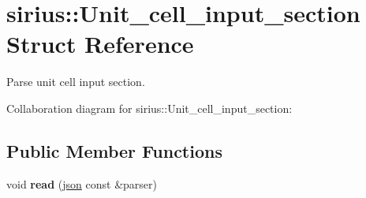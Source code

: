 \hypertarget{structsirius_1_1_unit__cell__input__section}{}\section{sirius\+:\+:Unit\+\_\+cell\+\_\+input\+\_\+section Struct Reference}
\label{structsirius_1_1_unit__cell__input__section}


Parse unit cell input section.  




Collaboration diagram for sirius\+:\+:Unit\+\_\+cell\+\_\+input\+\_\+section\+:
\subsection*{Public Member Functions}
\begin{DoxyCompactItemize}
\item 
\hypertarget{structsirius_1_1_unit__cell__input__section_a040d05ceeac53e931b7c1f6e12b10fcf}{}void {\bfseries read} (\hyperlink{classnlohmann_1_1basic__json}{json} const \&parser)\label{structsirius_1_1_unit__cell__input__section_a040d05ceeac53e931b7c1f6e12b10fcf}

\end{DoxyCompactItemize}
